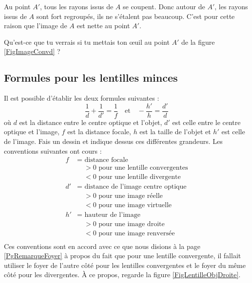 \documentclass[a4paper,12pt]{book}
\theoremstyle{mes_exemples}	\newtheorem{exemple}[numtho]{Exemple}
\theoremstyle{mes_tho}
\begin{document}
Au point $A'$, tous les rayons issus de $A$ se coupent. Donc autour de $A'$, les rayons issus de $A$ sont fort \og regroupés\fg, ils ne s'étalent pas beaucoup. C'est pour cette raison que l'image de $A$ est nette au point $A'$. 

\begin{exercice}
Qu'est-ce que tu verrais si tu mettais ton \oe uil au point $A'$ de la figure \ref{FigImageConvd} ?
\end{exercice}

\subsection{Formules pour les lentilles minces}

Il est possible d'établir les deux formules suivantes :
\begin{equation}
  \frac{1}{ d }+\frac{1}{ d' }=\frac{1}{ f }\quad\text{et}\quad -\frac{ h' }{ h }=\frac{ d' }{ d }
\end{equation}
où $d$ est la distance entre le centre optique et l'objet, $d'$ est celle entre le centre optique et l'image, $f$ est la distance focale, $h$ est la taille de l'objet et $h'$ est celle de l'image. Fais un dessin et indique dessus ces différentes grandeurs. Les conventions suivantes ont cours :
\begin{align*}
   f&=\text{ distance focale}\\
	&\quad >0\text{ pour une lentille convergentes}\\
	&\quad <0\text{ pour une lentille divergente}\\
  d'&=\text{ distance de l'image centre optique}\\
	&\quad >0\text{ pour une image réelle}\\
	&\quad <0\text{ pour une image virtuelle}\\
  h'&=\text{ hauteur de l'image}\\
	&\quad >0\text{ pour une image droite}\\
	&\quad <0\text{ pour une image renversée}\\
\end{align*}
Ces conventions sont en accord avec ce que nous disions à la page \ref{PgRemarqueFoyer} à propos du fait que pour une lentille convergente, il fallait utiliser le foyer de l'autre côté pour les lentilles convergentes et le foyer du même côté pour les divergentes. À ce propos, regarde la figure \ref{FigLentilleObjDroite}.
\end{document}
